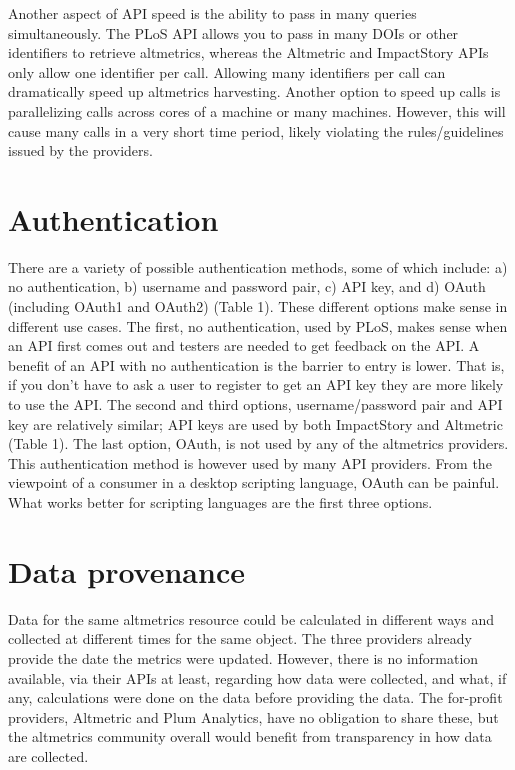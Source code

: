 \documentclass[letterpaper,superscriptaddress,showkeys,longbibliography]{revtex4-1}\usepackage{graphicx, color}
\begin{document}
Another aspect of API speed is the ability to pass in many queries simultaneously. The PLoS API allows you to pass in many DOIs or other identifiers to retrieve altmetrics, whereas the Altmetric and ImpactStory APIs only allow one identifier per call. Allowing many identifiers per call can dramatically speed up altmetrics harvesting. Another option to speed up calls is parallelizing calls across cores of a machine or many machines.  However, this will cause many calls in a very short time period, likely violating the rules/guidelines issued by the providers.


\section{Authentication}

There are a variety of possible authentication methods, some of which include: a) no authentication, b) username and password pair, c) API key, and d) OAuth (including OAuth1 and OAuth2) (Table 1). These different options make sense in different use cases. The first, no authentication, used by PLoS, makes sense when an API first comes out and testers are needed to get feedback on the API. A benefit of an API with no authentication is the barrier to entry is lower. That is, if you don't have to ask a user to register to get an API key they are more likely to use the API. The second and third options, username/password pair and API key are relatively similar; API keys are used by both ImpactStory and Altmetric (Table 1). The last option, OAuth, is not used by any of the altmetrics providers. This authentication method is however used by many API providers. From the viewpoint of a consumer in a desktop scripting language, OAuth can be painful. What works better for scripting languages are the first three options.  

\section{Data provenance}

Data for the same altmetrics resource could be calculated in different ways and collected at different times for the same object. The three providers already provide the date the metrics were updated. However, there is no information available, via their APIs at least, regarding how data were collected, and what, if any, calculations were done on the data before providing the data. The for-profit providers, Altmetric and Plum Analytics, have no obligation to share these, but the altmetrics community overall would benefit from transparency in how data are collected. 
\end{document}
